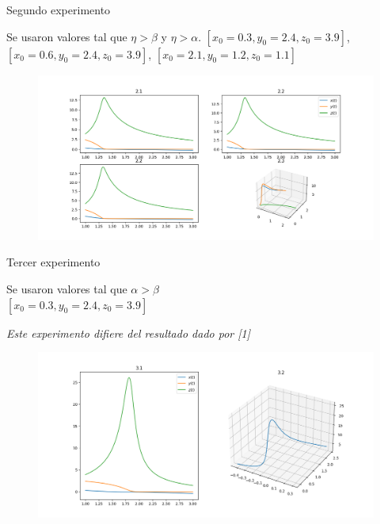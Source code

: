 \documentclass{beamer}
\begin{document}
\begin{frame}
    {Segundo experimento}

    Se usaron valores tal que $\eta > \beta$ y $\eta > \alpha$.
    $[x_0=0.3, y_0=2.4, z_0=3.9]$,
    $[x_0=0.6, y_0=2.4, z_0=3.9]$, $[x_0=2.1, y_0=1.2, z_0=1.1]$

    \begin{figure}[h!]
        \includegraphics[width=\linewidth]{./images/2.png}
    \end{figure}

\end{frame}
\begin{frame}
    {Tercer experimento}

    Se usaron valores tal que $\alpha > \beta$\\
    $[x_0=0.3, y_0=2.4, z_0=3.9]$


    {\it\scriptsize Este experimento difiere del resultado dado por [1]}

    \begin{figure}[h!]
        \includegraphics[width=\linewidth]{./images/3.png}
    \end{figure}

\end{frame}
\end{document}
